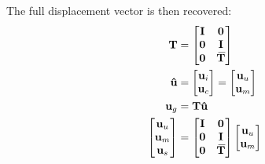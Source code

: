 \documentclass[10pt,b5paper,titlepage]{book}
\newcommand{\m}{\mathbf}
\newcommand{\closure}[2][3]{%
{}\mkern#1mu\overline{\mkern-#1mu#2}}
\newenvironment{eqarray}
{
    \begin{eqnarray}
        \begin{aligned}
}
{
        \end{aligned}
    \end{eqnarray}
}
\begin{document}
The full displacement vector is then recovered:
\begin{eqarray}
    \m{T} &= \begin{bmatrix}
        \m{I} & \m{0} \\
        \m{0} & \m{I} \\
        \m{0} & \m{\closure{T}} \\
    \end{bmatrix} \\
    \m{\hat{u}} &= \begin{bmatrix}
        \m{u}_i \\
        \m{u}_c \\
    \end{bmatrix}
    = \begin{bmatrix}
        \m{u}_u \\
        \m{u}_m \\
    \end{bmatrix} \\
    \m{u}_g &= \m{T} \m{\hat{u}} \\
    \begin{bmatrix}
        \m{u}_u \\
        \m{u}_m \\
        \m{u}_s \\
    \end{bmatrix}
    &= \begin{bmatrix}
        \m{I} & \m{0} \\
        \m{0} & \m{I} \\
        \m{0} & \m{\closure{T}} \\
    \end{bmatrix}
    \begin{bmatrix}
        \m{u}_u \\
        \m{u}_m \\
    \end{bmatrix}
\end{eqarray}
\end{document}
